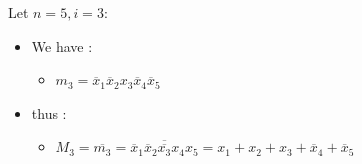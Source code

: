 \documentclass[12pt,openany, tikz,border=10pt]{book}
\begin{document}
			      	Let $n=5, i=3$:
			      	\begin{itemize}
			      		\item[]We have :
			      		      \begin{itemize}
			      		      	\item[] $m_3 = \overline{x}_1 \overline{x}_2 x_3 \overline{x}_4 \overline{x}_5$
			      		      \end{itemize}
			      		\item[]thus :
			      		      \begin{itemize}
			      		      	\item[] $M_3 = \overline{m_3} =  \overline{\overline{x}_1 \overline{x}_2 \overline{x_3} x_4 x_5} = x_1 + x_2 + x_3 + \overline{x}_4 + \overline{x}_5$ \newline
			      		      \end{itemize}
			      	\end{itemize}
\end{document}
